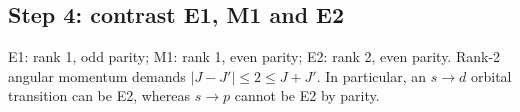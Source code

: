 \subsection*{Step 4: contrast E1, M1 and E2}
E1: rank 1, odd parity; M1: rank 1, even parity;
E2: rank 2, even parity. Rank-2 angular momentum
demands \(|J-J'|\le2\le J+J'\). In particular,
an \(s\to d\) orbital transition can be E2,
whereas \(s\to p\) cannot be E2 by parity.
